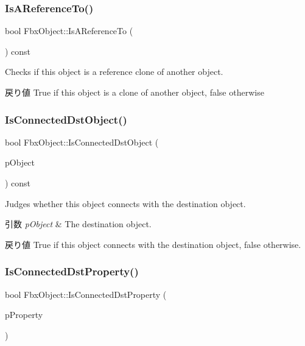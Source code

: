 \subsubsection{\texorpdfstring{Is\+A\+Reference\+To()}{IsAReferenceTo()}}
{\footnotesize\ttfamily bool Fbx\+Object\+::\+Is\+A\+Reference\+To (\begin{DoxyParamCaption}{ }\end{DoxyParamCaption}) const}

Checks if this object is a reference clone of another object. \begin{DoxyReturn}{戻り値}
{\ttfamily True} if this object is a clone of another object, {\ttfamily false} otherwise 
\end{DoxyReturn}
\mbox{\label{class_fbx_object_a06725964170902b4d79453d76326fc5b}} 
\subsubsection{\texorpdfstring{Is\+Connected\+Dst\+Object()}{IsConnectedDstObject()}}
{\footnotesize\ttfamily bool Fbx\+Object\+::\+Is\+Connected\+Dst\+Object (\begin{DoxyParamCaption}\item[{const \hyperlink{class_fbx_object}{Fbx\+Object} $\ast$}]{p\+Object }\end{DoxyParamCaption}) const}

Judges whether this object connects with the destination object. 
\begin{DoxyParams}{引数}
{\em p\+Object} & The destination object. \\
\hline
\end{DoxyParams}
\begin{DoxyReturn}{戻り値}
{\ttfamily True} if this object connects with the destination object, {\ttfamily false} otherwise. 
\end{DoxyReturn}
\mbox{\label{class_fbx_object_a678e5ccdbf6ab28c1df239fbdcea76d3}} 
\subsubsection{\texorpdfstring{Is\+Connected\+Dst\+Property()}{IsConnectedDstProperty()}}
{\footnotesize\ttfamily bool Fbx\+Object\+::\+Is\+Connected\+Dst\+Property (\begin{DoxyParamCaption}\item[{const \hyperlink{class_fbx_property}{Fbx\+Property} \&}]{p\+Property }\end{DoxyParamCaption})}

